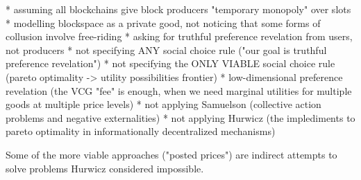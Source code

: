 \documentclass[oneside]{article}   	%
\begin{document}
 * assuming all blockchains give block producers "temporary monopoly" over slots
 * modelling blockspace as a private good, not noticing that some forms of collusion involve free-riding
 * asking for truthful preference revelation from users, not producers
 * not specifying ANY social choice rule ("our goal is truthful preference revelation")
 * not specifying the ONLY VIABLE social choice rule (pareto optimality -> utility possibilities frontier)
 * low-dimensional preference revelation (the VCG "fee" is enough, when we need marginal utilities for multiple goods at multiple price levels)
 * not applying Samuelson (collective action problems and negative externalities)
 * not applying Hurwicz (the implediments to pareto optimality in informationally decentralized mechanisms)

Some of the more viable approaches ("posted prices") are indirect attempts to solve problems Hurwicz considered impossible.

\pagebreak
\end{document}
